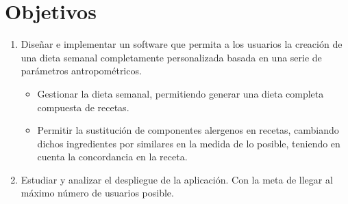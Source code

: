 \section{Objetivos}
\begin{enumerate}
    \item Diseñar e implementar un software que permita a los usuarios la creación de una dieta semanal completamente personalizada basada en una serie de parámetros antropométricos.
    \begin{itemize}
        \item Gestionar la dieta semanal, permitiendo generar una dieta completa compuesta de recetas.
        \item Permitir la sustitución de componentes alergenos en recetas, cambiando dichos ingredientes por similares en la medida de lo posible, teniendo en cuenta la concordancia en la receta.
    \end{itemize}
    \item Estudiar y analizar el despliegue de la aplicación. Con la meta de llegar al máximo número de usuarios posible.
\end{enumerate}